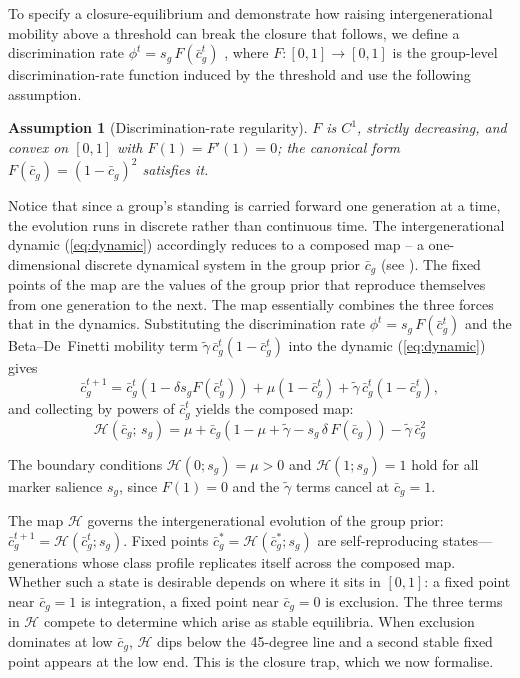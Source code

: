 \documentclass[pdflatex,sn-basic]{sn-jnl}
\theoremstyle{thmstyleone}
\newtheorem{assumption}{Assumption}
\numberwithin{proposition}{subsection}
\begin{document}
To specify a closure-equilibrium  and demonstrate how raising intergenerational mobility above a threshold can break the closure that follows, we define a discrimination rate $\phi^t = s_g\,F(\bar{c}_g^t)$
, where $F:[0,1] \to [0,1]$ is the group-level
discrimination-rate function induced by the threshold and use the following assumption.

\begin{assumption}[Discrimination-rate regularity]
\label{ass:Freg}
$F$ is $C^1$, strictly decreasing, and convex on $[0,1]$ with
$F(1)=F'(1)=0$; the canonical form $F(\bar{c}_g)=(1-\bar{c}_g)^2$
satisfies it.
\end{assumption}


Notice that since a group's standing is carried forward one generation at a time,
the evolution runs in discrete rather than continuous time. The intergenerational
dynamic (\ref{eq:dynamic}) accordingly reduces to a composed map -- a
one-dimensional discrete dynamical system in the
group prior $\bar{c}_g$ (see \citealp{Galor2007,MedioLines2001}). The fixed points of the map are the values of the group prior that reproduce themselves from one generation to the next. The map essentially combines the three forces that in the dynamics. Substituting the discrimination rate $\phi^t = s_g\,F(\bar c_g^t)$ and
the Beta--De~Finetti mobility term $\tilde\gamma\,\bar c_g^t(1-\bar c_g^t)$
into the dynamic (\ref{eq:dynamic}) gives
\begin{equation*}
\bar c_g^{t+1} = \bar c_g^t(1 - \delta s_g F(\bar c_g^t)) + \mu(1 - \bar c_g^t) + \tilde\gamma\,\bar c_g^t(1 - \bar c_g^t),
\end{equation*}
and collecting by powers of $\bar c_g^t$ yields the composed map:
\begin{equation}
  \mathcal{H}(\bar{c}_g;\, s_g) = \mu + \bar{c}_g(1 - \mu + \tilde{\gamma}
  - s_g\,\delta\, F(\bar{c}_g))
  - \tilde{\gamma}\,\bar{c}_g^2
  \label{eq:composed}
\end{equation}

The boundary conditions $\mathcal{H}(0; s_g) = \mu > 0$ and
$\mathcal{H}(1; s_g) = 1$ hold for all marker salience $s_g$, since $F(1) = 0$ and the
$\tilde{\gamma}$ terms cancel at $\bar{c}_g = 1$.

The map $\mathcal{H}$ governs the intergenerational evolution of the group
prior: $\bar{c}_g^{t+1} = \mathcal{H}(\bar{c}_g^t; s_g)$. Fixed
points $\bar{c}_g^* = \mathcal{H}(\bar{c}_g^*; s_g)$ are self-reproducing
states---generations whose class profile replicates itself across
the composed map. Whether such a state is desirable
depends on where it sits in $[0,1]$: a fixed point near
$\bar{c}_g = 1$ is integration, a fixed point near $\bar{c}_g = 0$
is exclusion. The three terms in $\mathcal{H}$ compete to determine which
arise as stable equilibria. When exclusion dominates at low
$\bar{c}_g$, $\mathcal{H}$ dips below the 45-degree line and a second stable
fixed point appears at the low end. This is the closure trap,
which we now formalise.
\end{document}
